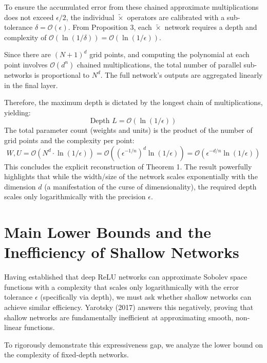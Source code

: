 \documentclass[12pt]{article}
\begin{document}
To ensure the accumulated error from these chained approximate multiplications does not exceed $\epsilon/2$, the individual $\tilde{\times}$ operators are calibrated with a sub-tolerance $\delta = \mathcal{O}(\epsilon)$. From Proposition 3, each $\tilde{\times}$ network requires a depth and complexity of $\mathcal{O}(\ln(1/\delta)) = \mathcal{O}(\ln(1/\epsilon))$. 

Since there are $(N+1)^d$ grid points, and computing the polynomial at each point involves $\mathcal{O}(d^n)$ chained multiplications, the total number of parallel sub-networks is proportional to $N^d$. The full network's outputs are aggregated linearly in the final layer. 

Therefore, the maximum depth is dictated by the longest chain of multiplications, yielding:
\begin{equation}
\text{Depth } L = \mathcal{O}(\ln(1/\epsilon))
\end{equation}
The total parameter count (weights and units) is the product of the number of grid points and the complexity per point:
\begin{equation}
W, U = \mathcal{O}(N^d \cdot \ln(1/\epsilon)) = \mathcal{O}\left( (\epsilon^{-1/n})^d \ln(1/\epsilon) \right) = \mathcal{O}(\epsilon^{-d/n} \ln(1/\epsilon))
\end{equation}
This concludes the explicit reconstruction of Theorem 1. The result powerfully highlights that while the width/size of the network scales exponentially with the dimension $d$ (a manifestation of the curse of dimensionality), the required depth scales only logarithmically with the precision $\epsilon$.




\section{Main Lower Bounds and the Inefficiency of Shallow Networks}

Having established that deep ReLU networks can approximate Sobolev space functions with a complexity that scales only logarithmically with the error tolerance $\epsilon$ (specifically via depth), we must ask whether shallow networks can achieve similar efficiency. Yarotsky (2017) answers this negatively, proving that shallow networks are fundamentally inefficient at approximating smooth, non-linear functions.

To rigorously demonstrate this expressiveness gap, we analyze the lower bound on the complexity of fixed-depth networks. 
\end{document}
